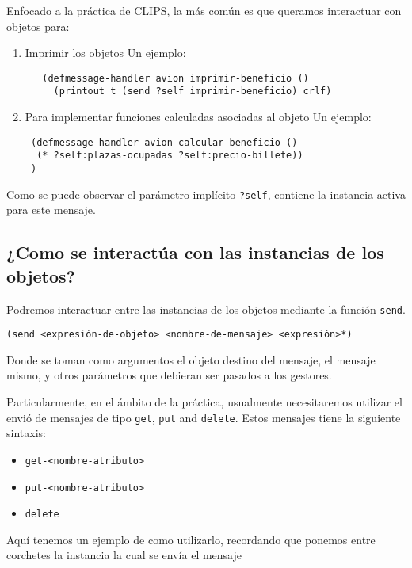 \documentclass[11pt,svgnames]{scrbook}
\begin{document}
Enfocado a la práctica de CLIPS, la más común es que queramos interactuar con
objetos para:

\begin{enumerate}
 \item  Imprimir los objetos
 Un ejemplo:

\begin{verbatim}
   (defmessage-handler avion imprimir-beneficio ()
     (printout t (send ?self imprimir-beneficio) crlf)\end{verbatim} 

\item Para implementar funciones calculadas asociadas al objeto
 Un ejemplo:

\begin{verbatim}
 (defmessage-handler avion calcular-beneficio ()
  (* ?self:plazas-ocupadas ?self:precio-billete)) 
 )
\end{verbatim} 
\end{enumerate}

Como se puede observar el parámetro implícito \texttt{?self}, contiene la
instancia activa para este mensaje.

\subsection{¿Como se interactúa con las instancias de los objetos?}

Podremos interactuar entre las instancias de los objetos mediante la función
\texttt{send}.
\medskip

\texttt{(send <expresión-de-objeto> <nombre-de-mensaje>   <expresión>*)}
\medskip

Donde se toman como argumentos el objeto destino del mensaje, el mensaje mismo,
y otros parámetros que debieran ser pasados a los gestores.

Particularmente, en el ámbito de la práctica, usualmente necesitaremos
utilizar el
envió de mensajes de tipo \texttt{get}, \texttt{put} and \texttt{delete}.
Estos mensajes tiene la siguiente sintaxis:

\begin{itemize}
\item \texttt{get-<nombre-atributo>}
\item \texttt{put-<nombre-atributo>}
\item \texttt{delete}
\end{itemize}


Aquí tenemos un ejemplo de como utilizarlo, recordando que ponemos entre
corchetes la instancia la cual se envía el mensaje  
\end{document}
